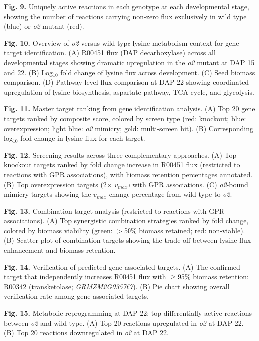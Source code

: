 \documentclass[12pt,a4paper]{article}
\begin{document}
\textbf{Fig. 9.} Uniquely active reactions in each genotype at each developmental stage, showing the number of reactions carrying non-zero flux exclusively in wild type (blue) or \textit{o2} mutant (red).

\textbf{Fig. 10.} Overview of \textit{o2} versus wild-type lysine metabolism context for gene target identification. (A) R00451 flux (DAP decarboxylase) across all developmental stages showing dramatic upregulation in the \textit{o2} mutant at DAP 15 and 22. (B) Log$_{10}$ fold change of lysine flux across development. (C) Seed biomass comparison. (D) Pathway-level flux comparison at DAP 22 showing coordinated upregulation of lysine biosynthesis, aspartate pathway, TCA cycle, and glycolysis.

\textbf{Fig. 11.} Master target ranking from gene identification analysis. (A) Top 20 gene targets ranked by composite score, colored by screen type (red: knockout; blue: overexpression; light blue: \textit{o2} mimicry; gold: multi-screen hit). (B) Corresponding log$_{10}$ fold change in lysine flux for each target.

\textbf{Fig. 12.} Screening results across three complementary approaches. (A) Top knockout targets ranked by fold change increase in R00451 flux (restricted to reactions with GPR associations), with biomass retention percentages annotated. (B) Top overexpression targets (2$\times$ $v_{max}$) with GPR associations. (C) \textit{o2}-bound mimicry targets showing the $v_{max}$ change percentage from wild type to \textit{o2}.

\textbf{Fig. 13.} Combination target analysis (restricted to reactions with GPR associations). (A) Top synergistic combination strategies ranked by fold change, colored by biomass viability (green: $>$50\% biomass retained; red: non-viable). (B) Scatter plot of combination targets showing the trade-off between lysine flux enhancement and biomass retention.

\textbf{Fig. 14.} Verification of predicted gene-associated targets. (A) The confirmed target that independently increases R00451 flux with $\geq$95\% biomass retention: R00342 (transketolase; \textit{GRMZM2G035767}). (B) Pie chart showing overall verification rate among gene-associated targets.

\textbf{Fig. 15.} Metabolic reprogramming at DAP 22: top differentially active reactions between \textit{o2} and wild type. (A) Top 20 reactions upregulated in \textit{o2} at DAP 22. (B) Top 20 reactions downregulated in \textit{o2} at DAP 22.
\end{document}

